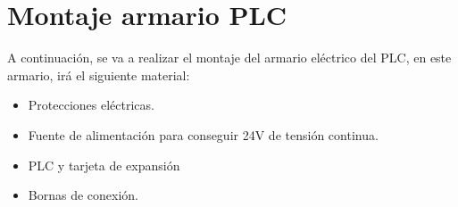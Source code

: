 \chapter{Montaje armario PLC}
\label{ane:plc}
A continuación, se va a realizar el montaje del armario eléctrico del PLC, en este armario, irá el siguiente material:

    \begin{itemize}
        \item{Protecciones eléctricas.}
        \item{Fuente de alimentación para conseguir 24V de tensión continua.}
        \item{PLC y tarjeta de expansión}
        \item{Bornas de conexión.}
    \end{itemize}

